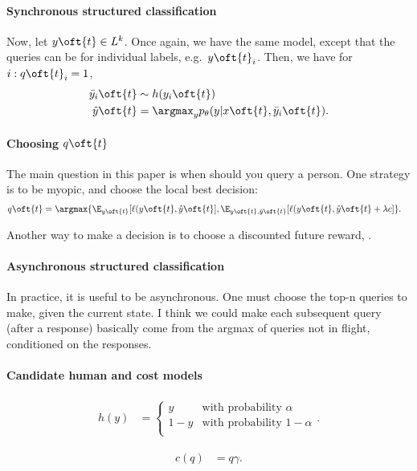 \paragraph{Synchronous structured classification}

Now, let $y\oft{t} \in L^k$. Once again, we have the same model, except that the queries can be for individual labels, e.g.\ $y\oft{t}_{i}$. Then, we have for $i : q\oft{t}_i = 1$,
\begin{align*}
  \yh_i\oft{t} &\sim h(y_i\oft{t}) \\
  \yt\oft{t} &= \argmax_y p_\theta(y | x\oft{t}, \yh_i\oft{t}).
\end{align*}

\paragraph{Choosing $q\oft{t}$}

The main question in this paper is when should you query a person.
One strategy is to be myopic, and choose the local best decision:
\begin{align*}
  q\oft{t} &= \argmax \{\E_{y\oft{t}}[\ell(y\oft{t}, \yt\oft{t}], \E_{y\oft{t}, \yh\oft{t}}[\ell(y\oft{t}, \yt\oft{t} + \lambda c] \}.
\end{align*}

Another way to make a decision is to choose a discounted future reward, .



\paragraph{Asynchronous structured classification}

In practice, it is useful to be asynchronous. One must choose the top-n queries to make, given the current state. I think we could make each subsequent query (after a response) basically come from the argmax of queries not in flight, conditioned on the responses.

\paragraph{Candidate human and cost models}

\begin{align*}
  h(y) &= 
  \begin{cases}
    y  & \text{with probability $\alpha$} \\
    1 - y  & \text{with probability $1 - \alpha$} \\
  \end{cases}.
\end{align*}

\begin{align*}
  c(q) &= q \gamma.
\end{align*}

%
%
%
%
%
